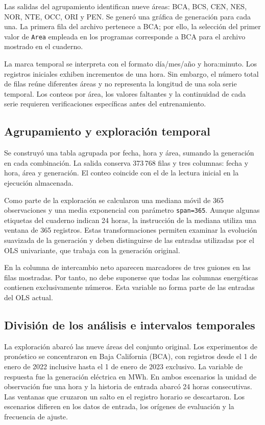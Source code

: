Las salidas del agrupamiento identifican nueve áreas: BCA, BCS, CEN, NES, NOR, NTE, OCC, ORI y PEN. Se generó una gráfica de generación para cada una. La primera fila del archivo pertenece a BCA; por ello, la selección del primer valor de \texttt{Area} empleada en los programas corresponde a BCA para el archivo mostrado en el cuaderno.

La marca temporal se interpreta con el formato día/mes/año y hora:minuto. Los registros iniciales exhiben incrementos de una hora. Sin embargo, el número total de filas reúne diferentes áreas y no representa la longitud de una sola serie temporal. Los conteos por área, los valores faltantes y la continuidad de cada serie requieren verificaciones específicas antes del entrenamiento.

\subsection{Agrupamiento y exploración temporal}

Se construyó una tabla agrupada por fecha, hora y área, sumando la generación en cada combinación. La salida conserva 373\,768 filas y tres columnas: fecha y hora, área y generación. El conteo coincide con el de la lectura inicial en la ejecución almacenada.

Como parte de la exploración se calcularon una mediana móvil de 365 observaciones y una media exponencial con parámetro \texttt{span=365}. Aunque algunas etiquetas del cuaderno indican 24 horas, la instrucción de la mediana utiliza una ventana de 365 registros. Estas transformaciones permiten examinar la evolución suavizada de la generación y deben distinguirse de las entradas utilizadas por el OLS univariante, que trabaja con la generación original.

En la columna de intercambio neto aparecen marcadores de tres guiones en las filas mostradas. Por tanto, no debe suponerse que todas las columnas energéticas contienen exclusivamente números. Esta variable no forma parte de las entradas del OLS actual.

\subsection{División de los análisis e intervalos temporales}

La exploración abarcó las nueve áreas del conjunto original. Los experimentos de pronóstico se concentraron en Baja California (BCA), con registros desde el 1 de enero de 2022 inclusive hasta el 1 de enero de 2023 exclusivo. La variable de respuesta fue la generación eléctrica en MWh. En ambos escenarios la unidad de observación fue una hora y la historia de entrada abarcó 24 horas consecutivas. Las ventanas que cruzaron un salto en el registro horario se descartaron. Los escenarios difieren en los datos de entrada, los orígenes de evaluación y la frecuencia de ajuste.

